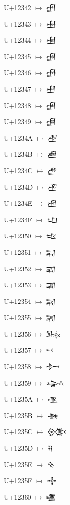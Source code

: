 {\noindent U+12342  $\mapsto$ {\cufont 𒍂}\par
\noindent U+12343  $\mapsto$ {\cufont 𒍃}\par
\noindent U+12344  $\mapsto$ {\cufont 𒍄}\par
\noindent U+12345  $\mapsto$ {\cufont 𒍅}\par
\noindent U+12346  $\mapsto$ {\cufont 𒍆}\par
\noindent U+12347  $\mapsto$ {\cufont 𒍇}\par
\noindent U+12348  $\mapsto$ {\cufont 𒍈}\par
\noindent U+12349  $\mapsto$ {\cufont 𒍉}\par
\noindent U+1234A  $\mapsto$ {\cufont 𒍊}\par
\noindent U+1234B  $\mapsto$ {\cufont 𒍋}\par
\noindent U+1234C  $\mapsto$ {\cufont 𒍌}\par
\noindent U+1234D  $\mapsto$ {\cufont 𒍍}\par
\noindent U+1234E  $\mapsto$ {\cufont 𒍎}\par
\noindent U+1234F  $\mapsto$ {\cufont 𒍏}\par
\noindent U+12350  $\mapsto$ {\cufont 𒍐}\par
\noindent U+12351  $\mapsto$ {\cufont 𒍑}\par
\noindent U+12352  $\mapsto$ {\cufont 𒍒}\par
\noindent U+12353  $\mapsto$ {\cufont 𒍓}\par
\noindent U+12354  $\mapsto$ {\cufont 𒍔}\par
\noindent U+12355  $\mapsto$ {\cufont 𒍕}\par
\noindent U+12356  $\mapsto$ {\cufont 𒍖}\par
\noindent U+12357  $\mapsto$ {\cufont 𒍗}\par
\noindent U+12358  $\mapsto$ {\cufont 𒍘}\par
\noindent U+12359  $\mapsto$ {\cufont 𒍙}\par
\noindent U+1235A  $\mapsto$ {\cufont 𒍚}\par
\noindent U+1235B  $\mapsto$ {\cufont 𒍛}\par
\noindent U+1235C  $\mapsto$ {\cufont 𒍜}\par
\noindent U+1235D  $\mapsto$ {\cufont 𒍝}\par
\noindent U+1235E  $\mapsto$ {\cufont 𒍞}\par
\noindent U+1235F  $\mapsto$ {\cufont 𒍟}\par
\noindent U+12360  $\mapsto$ {\cufont 𒍠}\par
}
